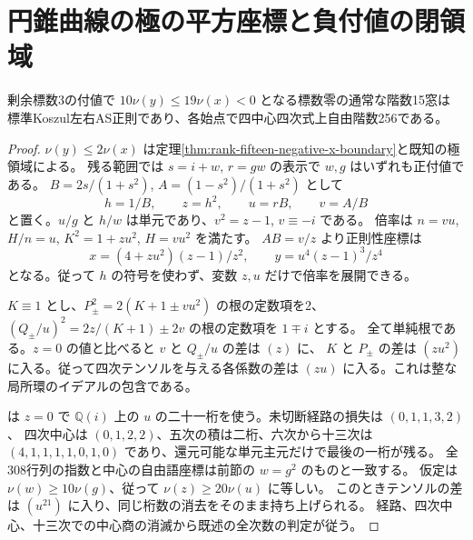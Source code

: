 \section{円錐曲線の極の平方座標と負付値の閉領域}
\label{sec:rank-fifteen-negative-x-fold}
\begin{theorem}\label{thm:rank-fifteen-negative-x-fold}
剰余標数3の付値で $10\nu(y)\le19\nu(x)<0$ となる標数零の通常な階数15窓は
標準Koszul左右AS正則であり、各始点で四中心四次式上自由階数256である。
\end{theorem}
\begin{proof}
$\nu(y)\le2\nu(x)$ は定理\ref{thm:rank-fifteen-negative-x-boundary}と既知の極領域による。
残る範囲では $s=i+w$, $r=gw$ の表示で $w,g$ はいずれも正付値である。
$B=2s/(1+s^2)$, $A=(1-s^2)/(1+s^2)$ として
\[
 h=1/B,\qquad z=h^2,\qquad u=rB,\qquad v=A/B
\]
と置く。$u/g$ と $h/w$ は単元であり、$v^2=z-1$, $v\equiv-i$ である。
倍率は $n=vu$, $H/n=u$, $K^2=1+zu^2$, $H=vu^2$ を満たす。
$AB=v/z$ より正則性座標は
\[
 x=(4+zu^2)(z-1)/z^2,\qquad y=u^4(z-1)^3/z^4
\]
となる。従って $h$ の符号を使わず、変数 $z,u$ だけで倍率を展開できる。

$K\equiv1$ とし、$P_\pm^2=2(K+1\pm vu^2)$ の根の定数項を2、
$(Q_\pm/u)^2=2z/(K+1)\pm2v$ の根の定数項を $1\mp i$ とする。
全て単純根である。$z=0$ の値と比べると $v$ と $Q_\pm/u$ の差は $(z)$ に、
$K$ と $P_\pm$ の差は $(zu^2)$ に入る。従って四次テンソルを与える各係数の差は
$(zu)$ に入る。これは整な局所環のイデアルの包含である。

 は $z=0$ で
$\mathbb Q(i)$ 上の $u$ の二十一桁を使う。未切断経路の損失は $(0,1,1,3,2)$、
四次中心は $(0,1,2,2)$、五次の積は二桁、六次から十三次は $(4,1,1,1,1,0,1,0)$
であり、還元可能な単元主元だけで最後の一桁が残る。
全308行列の指数と中心の自由語座標は前節の $w=g^2$ のものと一致する。
仮定は $\nu(w)\ge10\nu(g)$、従って $\nu(z)\ge20\nu(u)$ に等しい。
このときテンソルの差は $(u^{21})$ に入り、同じ桁数の消去をそのまま持ち上げられる。
経路、四次中心、十三次での中心商の消滅から既述の全次数の判定が従う。
\end{proof}
